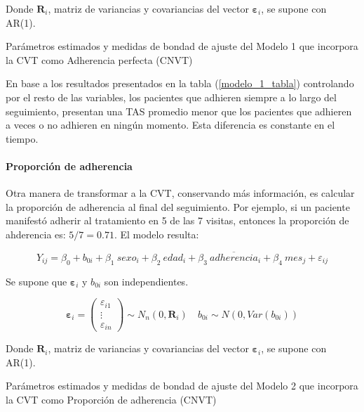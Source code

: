 \documentclass[spanish]{article}
\numberwithin{figure}{subsection}
\numberwithin{equation}{subsection}
\numberwithin{table}{subsection}
\begin{document}
Donde $\bm{R}_i$, matriz de variancias y covariancias del vector
$\bm{\varepsilon}_{i}$, se supone con AR(1).

\begin{table}[H]
	\centering
	\caption{Parámetros estimados y medidas de bondad de ajuste del Modelo 1 que incorpora la CVT como Adherencia perfecta (CNVT)}
	\label{modelo_1_tabla}
	
\end{table}

En base a los resultados presentados en la tabla (\ref{modelo_1_tabla}) controlando por el
resto de las variables, los pacientes que adhieren siempre a lo largo del
seguimiento, presentan una TAS promedio menor que los pacientes que adhieren a
veces o no adhieren en ningún momento. Esta diferencia es constante en el
tiempo.

\paragraph{Proporción de adherencia} \mbox{}

Otra manera de transformar a la CVT, conservando más información, es calcular la
proporción de adherencia al final del seguimiento. Por ejemplo, si un paciente
manifestó adherir al tratamiento en 5 de las 7 visitas, entonces la proporción
de ahderencia es: $5/7= 0.71$. El modelo resulta:

\begin{equation}
	\label{modelo_2}
	Y_{ij} = \beta_0 + b_{0i} + \beta_1\ sexo_i + \beta_2\ edad_i + \beta_3\ \overline{adherencia}_i
	+ \beta_4\ mes_j + \varepsilon_{ij}
\end{equation}

Se supone que $\bm{\varepsilon}_i$ y $b_{0i}$ son independientes.

\[ 
	\bm{\varepsilon}_i = \begin{pmatrix} \varepsilon_{i1} \\ \vdots \\ \varepsilon_{in} \end{pmatrix} \sim N_{n}(0, \bm{R}_i)
	\quad
	b_{0i} \sim N(0, Var(b_{0i}))
\]

Donde $\bm{R}_i$, matriz de variancias y covariancias del vector
$\bm{\varepsilon}_{i}$, se supone con AR(1).

\begin{table}[H]
	\centering
	\caption{Parámetros estimados y medidas de bondad de ajuste del Modelo 2 que incorpora la CVT como Proporción de adherencia (CNVT)}
	\label{modelo_2_tabla}
	
\end{table}
\end{document}
